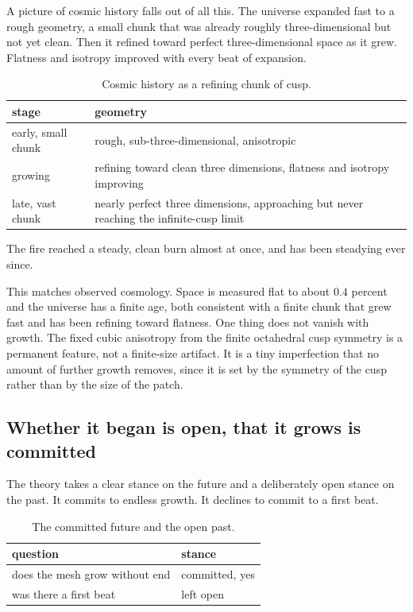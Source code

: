 A picture of cosmic history falls out of all this. The universe expanded fast to a rough geometry, a small chunk that was already roughly three-dimensional but not yet clean. Then it refined toward perfect three-dimensional space as it grew. Flatness and isotropy improved with every beat of expansion.

\begin{table}[ht]
\centering
\begin{tabular}{@{}ll@{}}
\toprule
stage & geometry \\
\midrule
early, small chunk & rough, sub-three-dimensional, anisotropic \\
growing & refining toward clean three dimensions, flatness and isotropy improving \\
late, vast chunk & nearly perfect three dimensions, approaching but never reaching the infinite-cusp limit \\
\bottomrule
\end{tabular}
\caption{Cosmic history as a refining chunk of cusp.}
\label{tab:refining}
\end{table}

\begin{principle}
The fire reached a steady, clean burn almost at once, and has been steadying ever since.
\end{principle}

This matches observed cosmology. Space is measured flat to about $0.4$ percent and the universe has a finite age, both consistent with a finite chunk that grew fast and has been refining toward flatness. One thing does not vanish with growth. The fixed cubic anisotropy from the finite octahedral cusp symmetry is a permanent feature, not a finite-size artifact. It is a tiny imperfection that no amount of further growth removes, since it is set by the symmetry of the cusp rather than by the size of the patch.

\subsection{Whether it began is open, that it grows is committed}

The theory takes a clear stance on the future and a deliberately open stance on the past. It commits to endless growth. It declines to commit to a first beat.

\begin{table}[ht]
\centering
\begin{tabular}{@{}ll@{}}
\toprule
question & stance \\
\midrule
does the mesh grow without end & committed, yes \\
was there a first beat & left open \\
\bottomrule
\end{tabular}
\caption{The committed future and the open past.}
\label{tab:open-past}
\end{table}

